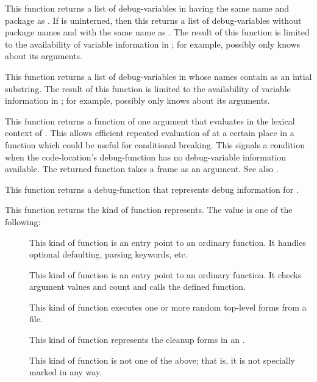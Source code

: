 {
This function returns a list of debug-variables in  having
the same name and package as .  If  is uninterned, then
this returns a list of debug-variables without package names and with the same
name as .  The result of this function is limited to the
availability of variable information in ; for example,
possibly  only knows about its arguments.
\enddefun


This function returns a list of debug-variables in  whose
names contain  as an intial substring.  The result of
this function is limited to the availability of variable information in
; for example, possibly  only knows
about its arguments.
\enddefun


This function returns a function of one argument that evaluates  in
the lexical context of .  This allows efficient
repeated evaluation of  at a certain place in a function which could
be useful for conditional breaking.  This signals a 
condition when the code-location's debug-function has no debug-variable
information available.  The returned function takes a frame as an
argument.  See also .
\enddefun


This function returns a debug-function that represents debug information for
.
\enddefun


This function returns the kind of function  represents.
The value is one of the following:
\begin{description}
\item[]
This kind of function is an entry point to an ordinary function.  It handles
optional defaulting, parsing keywords, etc.
\item[]
This kind of function is an entry point to an ordinary function.  It checks
argument values and count and calls the defined function.
\item[]
This kind of function executes one or more random top-level forms
from a file.
\item[]
This kind of function represents the cleanup forms in an .
\item[\nil]
This kind of function is not one of the above; that is, it is not specially
marked in any way.
\end{description}
\enddefun


}
